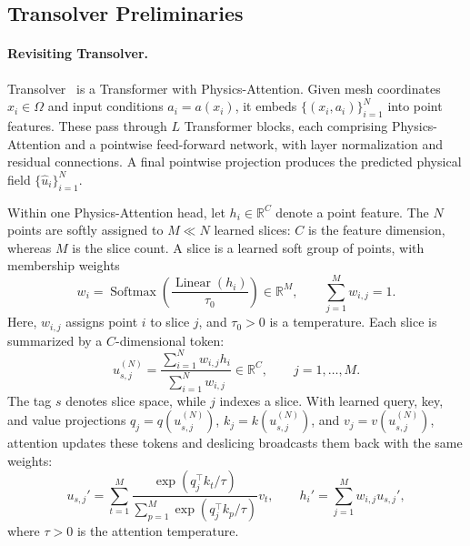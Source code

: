 \subsection{Transolver Preliminaries}
\label{sec:transolver_preliminaries}

\paragraph{Revisiting Transolver.}
Transolver~\citep{wu2024transolver} is a Transformer with
Physics-Attention. Given mesh coordinates $x_i\in\Omega$ and input
conditions $a_i=a(x_i)$, it embeds $\{(x_i,a_i)\}_{i=1}^{N}$ into point
features. These pass through $L$ Transformer blocks, each comprising
Physics-Attention and a pointwise feed-forward network, with layer
normalization and residual connections. A final pointwise projection
produces the predicted physical field $\{\widehat u_i\}_{i=1}^{N}$.

Within one Physics-Attention head, let $h_i\in\mathbb{R}^{C}$ denote a
point feature. The $N$ points are softly assigned to $M\ll N$ learned
slices: $C$ is the feature dimension, whereas $M$ is the slice count.
A slice is a learned soft group of points, with membership weights
\begin{equation}
    w_i=\operatorname{Softmax}\!\left(
        \frac{\operatorname{Linear}(h_i)}{\tau_0}\right)
    \in\mathbb{R}^{M},
    \qquad \sum_{j=1}^{M}w_{i,j}=1.
    \label{eq:transolver_slice_weights}
\end{equation}
Here, $w_{i,j}$ assigns point $i$ to slice $j$, and $\tau_0>0$ is a
temperature. Each slice is summarized by a $C$-dimensional token:
\begin{equation}
    u_{s,j}^{(N)}
    =\frac{\sum_{i=1}^{N}w_{i,j}h_i}{\sum_{i=1}^{N}w_{i,j}}
    \in\mathbb{R}^{C},\qquad j=1,\ldots,M.
    \label{eq:transolver_physics_state}
\end{equation}
The tag $s$ denotes slice space, while $j$ indexes a slice. With learned
query, key, and value projections $q_j=q(u_{s,j}^{(N)})$,
$k_j=k(u_{s,j}^{(N)})$, and $v_j=v(u_{s,j}^{(N)})$, attention updates
these tokens and deslicing broadcasts them back with the same weights:
\begin{equation}
    u_{s,j}'
    =\sum_{t=1}^{M}
      \frac{\exp(q_j^{\top}k_t/\tau)}
           {\sum_{p=1}^{M}\exp(q_j^{\top}k_p/\tau)}v_t,
    \qquad
    h_i'=\sum_{j=1}^{M}w_{i,j}u_{s,j}',
    \label{eq:transolver_state_attention}
\end{equation}
where $\tau>0$ is the attention temperature.

